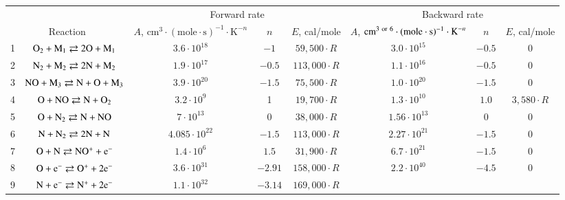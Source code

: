 \documentclass{warpdoc}
\renewcommand{\fontsizetable}{\footnotesize\scalefont{0.9}}
\begin{document}
%
\begin{table}[t]
\fontsizetable
\begin{center}
\begin{threeparttable}
\begin{tabular}{cccccccc} 
\toprule
~&~&\multicolumn{3}{c}{Forward rate} & \multicolumn{3}{c}{Backward rate} \\
 \cmidrule(lr){3-5}\cmidrule(lr){6-8}
\multicolumn{2}{c}{Reaction} & $A$, $\textrm{cm}^3\cdot(\textrm{mole}\cdot \textrm{s})^{-1}\cdot \textrm{K}^{-n}$ & $n$ & $E$, cal/mole  & $A$, $\textrm{cm}^{\rm 3~or~6}\cdot(\textrm{mole}\cdot \textrm{s})^{-1}\cdot \textrm{K}^{-n}$ & $n$ & $E$, cal/mole  \\ 
\midrule
1 & $\rm O_2 + M_1 \rightleftarrows 2O+M_1$ & $3.6 \cdot 10^{18}$  & $-1$    & $59,500 \cdot R$  
                                          & $3.0 \cdot 10^{15}$  & $-0.5$  & 0\\
2 & $\rm N_2 + M_2 \rightleftarrows 2N+M_2$ & $1.9 \cdot 10^{17}$ & $-0.5$ & $113,000 \cdot R$ 
                                          & $1.1 \cdot 10^{16}$  & $-0.5$  & 0\\
3 & $\rm NO + M_3 \rightleftarrows N+O+M_3$ & $3.9 \cdot 10^{20}$ & $-1.5$ & $75,500\cdot R$ 
                                          & $1.0 \cdot 10^{20}$  & $-1.5$  & 0\\
4 & $\rm O + NO \rightleftarrows N+O_2$ & $3.2 \cdot 10^{9}$ & 1 & $19,700 \cdot R$ 
                                          & $1.3 \cdot 10^{10}$  & $1.0$  & $3,580 \cdot R$\\
5 & $\rm O + N_2 \rightleftarrows N+NO$ & $7 \cdot 10^{13}$ & 0 & $38,000\cdot R$ 
                                          & $1.56 \cdot 10^{13}$  & $0$  & 0\\
6 & $\rm N + N_2 \rightleftarrows 2N+N$ & $4.085 \cdot 10^{22}$ & $-1.5$ & $113,000\cdot R$ 
                                          & $2.27 \cdot 10^{21}$  & $-1.5$  & 0\\
7 & $\rm O + N \rightleftarrows NO^{+}+e^{-}$ & $1.4 \cdot 10^{6}$ & $1.5$ & $31,900\cdot R$ 
                                          & $6.7 \cdot 10^{21}$  & $-1.5$  & 0\\
8 & $\rm O + e^- \rightleftarrows O^++2e^-$ & $3.6 \cdot 10^{31}$ & $-2.91$ & $158,000\cdot R$ 
                                          & $2.2 \cdot 10^{40}$  & $-4.5$  & 0\\
9 & $\rm N + e^- \rightleftarrows N^++2e^-$ & $1.1 \cdot 10^{32}$ & $-3.14$ & $169,000\cdot R$ 

\end{tabular}
\end{threeparttable}
\end{center}
\end{table}
\end{document}
